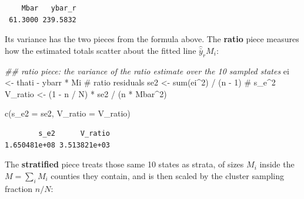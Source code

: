 \documentclass[
  letterpaper,
  DIV=11,
  numbers=noendperiod]{scrreprt}
\newenvironment{Shaded}{\begin{snugshade}}{\end{snugshade}}
\newcommand{\AttributeTok}[1]{\textcolor[rgb]{0.40,0.45,0.13}{#1}}
\newcommand{\CommentTok}[1]{\textcolor[rgb]{0.37,0.37,0.37}{#1}}
\newcommand{\DecValTok}[1]{\textcolor[rgb]{0.68,0.00,0.00}{#1}}
\newcommand{\DocumentationTok}[1]{\textcolor[rgb]{0.37,0.37,0.37}{\textit{#1}}}
\newcommand{\FunctionTok}[1]{\textcolor[rgb]{0.28,0.35,0.67}{#1}}
\newcommand{\NormalTok}[1]{\textcolor[rgb]{0.00,0.23,0.31}{#1}}
\newcommand{\OtherTok}[1]{\textcolor[rgb]{0.00,0.23,0.31}{#1}}
\newcommand{\SpecialCharTok}[1]{\textcolor[rgb]{0.37,0.37,0.37}{#1}}
\renewcommand{\[}{\begin{equation}}
\renewcommand{\]}{\end{equation}}
\begin{document}
\begin{verbatim}
    Mbar   ybar_r 
 61.3000 239.5832 
\end{verbatim}

Its variance has the two pieces from the formula above. The
\textbf{ratio} piece measures how the estimated totals scatter about the
fitted line \(\hat{\bar{y}}_r M_i\):

\begin{Shaded}
\begin{Highlighting}[]
\DocumentationTok{\#\# ratio piece: the variance of the ratio estimate over the 10 sampled states}
\NormalTok{ei  }\OtherTok{\textless{}{-}}\NormalTok{ thati }\SpecialCharTok{{-}}\NormalTok{ ybarr }\SpecialCharTok{*}\NormalTok{ Mi          }\CommentTok{\# ratio residuals}
\NormalTok{se2 }\OtherTok{\textless{}{-}} \FunctionTok{sum}\NormalTok{(ei}\SpecialCharTok{\^{}}\DecValTok{2}\NormalTok{) }\SpecialCharTok{/}\NormalTok{ (n }\SpecialCharTok{{-}} \DecValTok{1}\NormalTok{)         }\CommentTok{\# s\_e\^{}2}
\NormalTok{V\_ratio }\OtherTok{\textless{}{-}}\NormalTok{ (}\DecValTok{1} \SpecialCharTok{{-}}\NormalTok{ n }\SpecialCharTok{/}\NormalTok{ N) }\SpecialCharTok{*}\NormalTok{ se2 }\SpecialCharTok{/}\NormalTok{ (n }\SpecialCharTok{*}\NormalTok{ Mbar}\SpecialCharTok{\^{}}\DecValTok{2}\NormalTok{)}

\FunctionTok{c}\NormalTok{(}\AttributeTok{s\_e2 =}\NormalTok{ se2, }\AttributeTok{V\_ratio =}\NormalTok{ V\_ratio)}
\end{Highlighting}
\end{Shaded}

\begin{verbatim}
        s_e2      V_ratio 
1.650481e+08 3.513821e+03 
\end{verbatim}

The \textbf{stratified} piece treats those same 10 states as strata, of
sizes \(M_i\) inside the \(M = \sum_i M_i\) counties they contain, and
is then scaled by the cluster sampling fraction \(n/N\):
\end{document}
